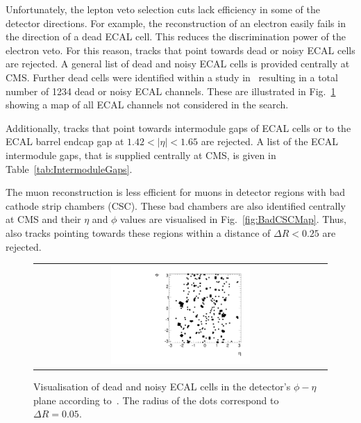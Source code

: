 Unfortunately, the lepton veto selection cuts lack efficiency in some of the detector directions.
For example, the reconstruction of an electron easily fails in the direction of a dead ECAL cell.
This reduces the discrimination power of the electron veto.
For this reason, tracks that point towards dead or noisy ECAL cells are rejected.
A general list of dead and noisy ECAL cells is provided centrally at CMS.
Further dead cells were identified within a study in~\cite{bib:CMS:DT_Thesis,bib:CMS:DT_8TeV_AN} resulting in a total number of 1234 dead or noisy ECAL channels. 
These are illustrated in Fig.~\ref{fig:DeadECALmap} showing a map of all ECAL channels not considered in the search.


Additionally, tracks that point towards intermodule gaps of ECAL cells or to the ECAL barrel endcap gap at $1.42<|\eta|<1.65$ are rejected.
A list of the ECAL intermodule gaps, that is supplied centrally at CMS, is given in Table~\ref{tab:IntermoduleGaps}.

The muon reconstruction is less efficient for muons in detector regions with bad cathode strip chambers (CSC).
These bad chambers are also identified centrally at CMS and their $\eta$ and $\phi$ values are visualised in Fig.~\ref{fig:BadCSCMap}.
Thus, also tracks pointing towards these regions within a distance of $\Delta R<0.25$ are rejected.

\begin{figure}[!t]
  \centering 
  \begin{tabular}{c}
    \includegraphics[width=0.49\textwidth]{figures/analysis/DeadECALMap2.pdf}
  \end{tabular}
  \caption{Visualisation of dead and noisy ECAL cells in the detector's $\phi - \eta$ plane according to~\cite{bib:CMS:DT_Thesis,bib:CMS:DT_8TeV_AN}.
           The radius of the dots correspond to $\Delta R=0.05$.}
  \label{fig:DeadECALmap}
\end{figure}

